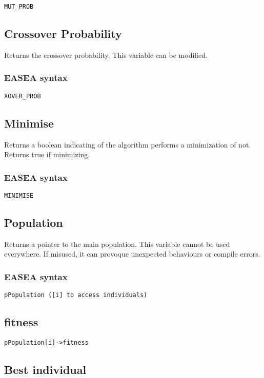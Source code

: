 \documentclass{book}
\begin{document}
\texttt{MUT\_PROB}

\subsection{Crossover Probability}\label{crossover-probability}

Returns the crossover probability. This variable can be modified.

\subsubsection{EASEA syntax}\label{easea-syntax-6}

\texttt{XOVER\_PROB}

\subsection{Minimise}\label{minimise}

Returns a boolean indicating of the algorithm performs a minimization of
not. Returns true if minimizing.

\subsubsection{EASEA syntax}\label{easea-syntax-7}

\texttt{MINIMISE}

\subsection{Population}\label{population}

Returns a pointer to the main population. This variable cannot be used
everywhere. If misused, it can provoque unexpected behaviours or compile
errors.

\subsubsection{EASEA syntax}\label{easea-syntax-8}

\texttt{pPopulation~({[}i{]}~to~access~individuals)}

\subsection{fitness}\label{fitness}

\texttt{pPopulation{[}i{]}-\textgreater{}fitness}

\subsection{Best individual}\label{best-individual}
\end{document}
